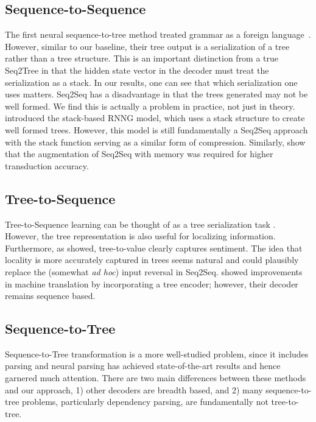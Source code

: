 \documentclass{article}
\begin{document}
\subsection{Sequence-to-Sequence}
The first neural sequence-to-tree  method treated grammar as a foreign language~\citep{vinyals2015grammar}. However, similar to our baseline, their tree output is a serialization of a tree rather than a tree structure. This is an important distinction from a true Seq2Tree in that the hidden state vector in the decoder must treat the serialization as a stack. In our results, one can see that which serialization one uses matters.
Seq2Seq has a disadvantage in that the trees generated may not be well formed. We find this is actually a problem in practice, not just in theory. \citet{dyer2016recurrent} introduced the stack-based RNNG model, which uses a stack structure to create well formed trees. However, this model is still fundamentally a Seq2Seq approach with the stack function serving as a similar form of compression. 
Similarly, \citet{grefenstette2015learning} show that the augmentation of Seq2Seq with memory was required for higher transduction accuracy.

\subsection{Tree-to-Sequence}
Tree-to-Sequence learning can be thought of as a tree serialization task \citep{eriguchi2016tree,eriguchi2016character}. However, the tree representation is also useful for localizing information. Furthermore, as \citep{Socher2011-nx} showed, tree-to-value clearly captures sentiment. The idea that locality is more accurately captured in trees seems natural and could plausibly replace the (somewhat {\it ad hoc}) input reversal in Seq2Seq. 
\citet{chen2017improved} showed improvements in machine translation by incorporating a tree encoder; however, their decoder remains sequence based.

\subsection{Sequence-to-Tree}
Sequence-to-Tree transformation is a more well-studied problem, since it includes parsing and neural parsing has achieved state-of-the-art results \citep{aharoni2017towards} and hence garnered much attention.  There are two main differences between these methods and our approach, 1) other decoders are breadth based, and 2) many sequence-to-tree problems, particularly dependency parsing, are fundamentally not tree-to-tree. 
\end{document}

